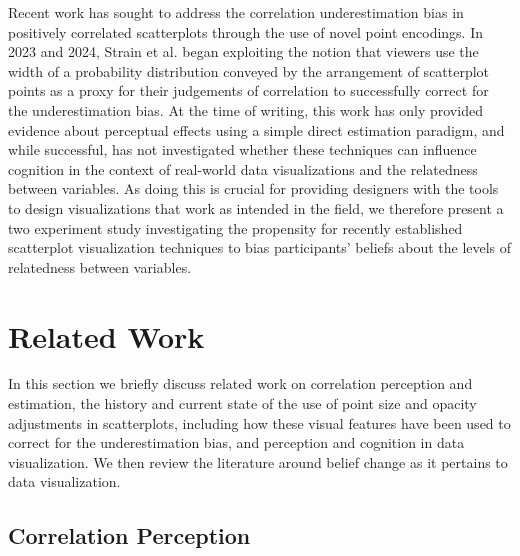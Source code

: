 \documentclass[manuscript,screen,review,anonymous]{acmart}
\begin{document}
Recent work has sought to address the correlation underestimation bias
in positively correlated scatterplots through the use of novel point
encodings. In 2023 and 2024, Strain et al.
\citep{strain_2023, strain_2023b, strain_2024} began exploiting the
notion that viewers use the width of a probability distribution conveyed
by the arrangement of scatterplot points as a proxy for their judgements
of correlation to successfully correct for the underestimation bias. At
the time of writing, this work has only provided evidence about
perceptual effects using a simple direct estimation paradigm, and while
successful, has not investigated whether these techniques can influence
cognition in the context of real-world data visualizations and the
relatedness between variables. As doing this is crucial for providing
designers with the tools to design visualizations that work as intended
in the field, we therefore present a two experiment study investigating
the propensity for recently established scatterplot visualization
techniques to bias participants' beliefs about the levels of relatedness
between variables.

\section{Related Work}\label{sec-rel-work-main}

In this section we briefly discuss related work on correlation
perception and estimation, the history and current state of the use of
point size and opacity adjustments in scatterplots, including how these
visual features have been used to correct for the underestimation bias,
and perception and cognition in data visualization. We then review the
literature around belief change as it pertains to data visualization.

\subsection{Correlation Perception}\label{sec-corr-percept}
\end{document}
